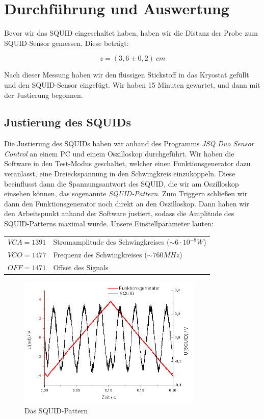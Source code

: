 \section{Durchführung und Auswertung}

Bevor wir das SQUID eingeschaltet haben, haben wir die Distanz der Probe zum SQUID-Sensor gemessen. Diese beträgt:

$$z = (3,6 \pm 0,2)\ cm$$

Nach dieser Messung haben wir den flüssigen Stickstoff in das Kryostat gefüllt und den SQUID-Sensor eingefügt. Wir haben 15 Minuten gewartet, und dann mit der Justierung begonnen.

\subsection{Justierung des SQUIDs}

Die Justierung des SQUIDs haben wir anhand des Programms \emph{JSQ Duo Sensor Control} an einem PC und einem Oszilloskop durchgeführt. Wir haben die Software in den Test-Modus geschaltet, welcher einen Funktionsgenerator dazu veranlasst, eine Dreieckspannung in den Schwingkreis einzukoppeln. Diese beeinflusst dann die Spannungsantwort des SQUID, die wir am Oszilloskop einsehen können, das sogenannte \emph{SQUID-Pattern}. Zum Triggern schließen wir dann den Funktionsgenerator noch direkt an den Oszilloskop.  Dann haben wir den Arbeitspunkt anhand der Software justiert, sodass die Amplitude des SQUID-Patterns maximal wurde. Unsere Einstellparameter lauten:\\

\begin{center}
\begin{tabular}[H]{l l}
	$VCA = 1391$ & Stromamplitude des Schwingkreises ($\sim 6\cdot 10^{-8} W$)\\
	$VCO = 1477$ & Frequenz des Schwingkreises ($\sim 760 MHz$)\\
	$OFF = 1471$  & Offset des Signals
\end{tabular}
\end{center}

\begin{figure}[H]
	\centering \includegraphics[width = 0.78\textwidth]{Bilder/Pattern1.png}
	\caption{Das SQUID-Pattern}
\end{figure}

